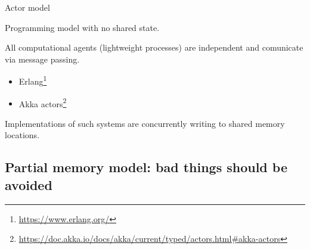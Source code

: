 
\begin{frame}[t,noframenumbering]{Actor model}

Programming model with no shared state.

All computational agents (lightweight processes) are independent and comunicate via message passing.

\pause
\begin{itemize}
  \item Erlang\footnote<2->{\tiny\url{https://www.erlang.org/}}
  \item Akka actors\footnote<2->{\tiny\url{https://doc.akka.io/docs/akka/current/typed/actors.html#akka-actors}}
\end{itemize}

\pause

Implementations of such systems are concurrently writing to shared memory locations.

\end{frame}


\subsection{Partial memory model: bad things should be avoided}
\showTOCSub

